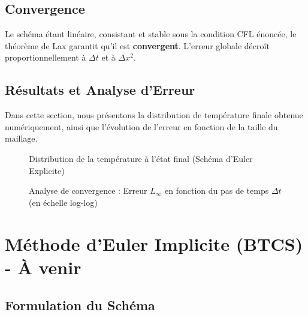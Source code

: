 \documentclass[11pt,a4paper]{article}
\begin{document}
\subsection{Convergence}
Le schéma étant linéaire, consistant et stable sous la condition CFL énoncée, le théorème de Lax garantit qu'il est \textbf{convergent}. L'erreur globale décroît proportionnellement à $\Delta t$ et à $\Delta x^2$.

\subsection{Résultats et Analyse d'Erreur}
Dans cette section, nous présentons la distribution de température finale obtenue numériquement, ainsi que l'évolution de l'erreur en fonction de la taille du maillage.

\begin{figure}[H]
    \centering
    \vspace{6cm} %
    \caption{Distribution de la température à l'état final (Schéma d'Euler Explicite)}
    \label{fig:euler_exp_final}
\end{figure}

\begin{figure}[H]
    \centering
    \vspace{6cm} %
    \caption{Analyse de convergence : Erreur $L_\infty$ en fonction du pas de temps $\Delta t$ (en échelle log-log)}
    \label{fig:euler_exp_conv}
\end{figure}


\newpage
\section{Méthode d'Euler Implicite (BTCS) - À venir}

\subsection{Formulation du Schéma}
\end{document}

